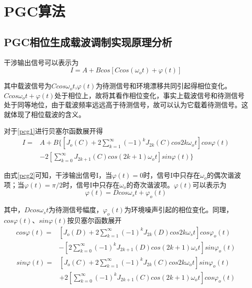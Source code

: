 \chapter{PGC算法}
\section{PGC相位生成载波调制实现原理分析}
干涉输出信号可以表示为
\begin{equation}
I=A+Bcos[Ccos(\omega_ot)+\varphi(t)]
\label{pcg1}
\end{equation}\par

其中载波信号为$Ccos\omega_o t$,$\varphi(t)$为待测信号和环境漂移共同引起得相位变化。$Ccos\omega_o t+\varphi(t)$处于相位上，故将其看作相位变化，事实上载波信号和待测信号处于同等地位，由于载波频率远远高于待测信号，故可以认为它载着待测信号。这就体现了相位载波的含义。\par
对于\ref{pcg1}进行贝塞尔函数展开得
\begin{equation}
\begin{aligned}
I=&A+B\Bigg\{ \left[J_o(C)+2\sum_{k=1}^{\infty}(-1)^{k}J_{2k}(C)cos2k\omega_o t\right]cos\varphi(t) \\
&-2 \left[\sum_{k=0}^{\infty}J_{2k+1}(C)cos(2k+1)\omega_{o}t\right]sin\varphi(t)  \Bigg\}
\end{aligned}
\label{pcg2}
\end{equation}\par

由式\ref{pcg2}可知，干涉输出信号I，当$\varphi(t)=0$时，信号I中只存在$\omega_o$的偶次谐波项；当$\varphi(t)=\pi/2$时，信号I中只存在$\omega_o$的奇次谐波项。$\varphi(t)$可以表示为
\begin{equation}
\varphi(t)=Dcos\omega_s t+\varphi_o(t)
\end{equation}


其中，$Dcos\omega_s t$为待测信号幅度，$\varphi_o(t)$为环境噪声引起的相位变化。同理，$cos\varphi(t)$、$sin\varphi(t)$按贝塞尔函数展开
\begin{equation}
\begin{aligned}
cos\varphi(t)=&\left[J_o(D)+2\sum_{k=1}^{\infty}(-1)^{k}J_{2k}(D)cos2k\omega_s t\right]cos\varphi_o(t) \\
&- \left[2\sum_{k=0}^{\infty}(-1)^{k}J_{2k+1}(D)cos(2k+1)\omega_{s}t\right]sin\varphi_o(t)
\end{aligned}
\label{pcg3}
\end{equation}
\begin{equation}
\begin{aligned}
sin\varphi(t)=&\left[J_o(C)+2\sum_{k=1}^{\infty}(-1)^{k}J_{2k}(C)cos2k\omega_o t\right]sin\varphi_o(t) \\
&+2 \left[\sum_{k=0}^{\infty}(-1)^{k}J_{2k+1}(C)cos(2k+1)\omega_{o}t\right]cos\varphi_o(t)
\end{aligned}
\label{pcg4}
\end{equation}\par


